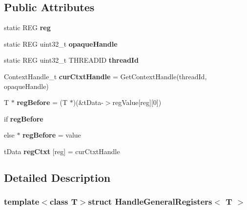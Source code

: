 \subsection*{Public Attributes}
\begin{DoxyCompactItemize}
\item 
\hypertarget{structHandleGeneralRegisters_a41c949d0a193af77658671c066c6855d}{static R\-E\-G {\bfseries reg}}\label{structHandleGeneralRegisters_a41c949d0a193af77658671c066c6855d}

\item 
\hypertarget{structHandleGeneralRegisters_a209211dc1f8f3965c160da822599231f}{static R\-E\-G uint32\-\_\-t {\bfseries opaque\-Handle}}\label{structHandleGeneralRegisters_a209211dc1f8f3965c160da822599231f}

\item 
static R\-E\-G uint32\-\_\-t T\-H\-R\-E\-A\-D\-I\-D {\bfseries thread\-Id}
\item 
\hypertarget{structHandleGeneralRegisters_a1c79da2d213ae8dd21079581d7ee69bf}{Context\-Handle\-\_\-t {\bfseries cur\-Ctxt\-Handle} = Get\-Context\-Handle(thread\-Id, opaque\-Handle)}\label{structHandleGeneralRegisters_a1c79da2d213ae8dd21079581d7ee69bf}

\item 
\hypertarget{structHandleGeneralRegisters_ae78d9091d4eb5eb5dc72a0c21c8aa87b}{T $\ast$ {\bfseries reg\-Before} = (T $\ast$)(\&t\-Data-\/$>$reg\-Value\mbox{[}reg\mbox{]}\mbox{[}0\mbox{]})}\label{structHandleGeneralRegisters_ae78d9091d4eb5eb5dc72a0c21c8aa87b}

\item 
if {\bfseries reg\-Before}
\item 
\hypertarget{structHandleGeneralRegisters_afce9ed50cad57b6e4118a0ab4b1edbef}{else $\ast$ {\bfseries reg\-Before} = value}\label{structHandleGeneralRegisters_afce9ed50cad57b6e4118a0ab4b1edbef}

\item 
\hypertarget{structHandleGeneralRegisters_a8178a7e792bad65cc8709ce40a03b128}{t\-Data {\bfseries reg\-Ctxt} \mbox{[}reg\mbox{]} = cur\-Ctxt\-Handle}\label{structHandleGeneralRegisters_a8178a7e792bad65cc8709ce40a03b128}

\end{DoxyCompactItemize}


\subsection{Detailed Description}
\subsubsection*{template$<$class T$>$struct Handle\-General\-Registers$<$ T $>$}



